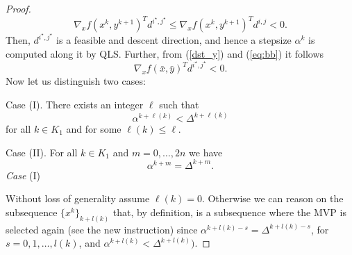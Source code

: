 \begin{proof}
\begin{equation}
 \nabla_xf(x^k,y^{k+1})^Td^{i^\star,j^\star}\le \nabla_xf(x^k,y^{k+1})^Td^{i,j}<0.
\end{equation}
Then, $d^{i^\star,j^\star}$ is a feasible and descent direction, and hence a stepsize $\alpha^k$ is computed along it by QLS.
Further, from (\ref{dst_y}) and (\ref{eq:bb}) it follows
\begin{equation}\label{desc_mvp}
 \nabla_xf(\bar x,\bar y)^Td^{i^\star,j^\star}<0.
\end{equation}
Now let us distinguish two cases:
\par\medskip\noindent
Case (I). There exists an integer $\ell$  such that
\begin{equation}\label{caseI}
 \alpha^{k+\ell(k)}<\Delta^{k+\ell(k)}
\end{equation}
for all $k\in K_1$ and for some $\ell(k)\le \ell$.
\par\medskip\noindent 
Case (II). For all $k\in K_1$ and $m=0,\ldots ,2n$ we have
\begin{equation}\label{caseII}
 \alpha^{k+m}=\Delta^{k+m}.
\end{equation}
{\it Case} (I)
\par\medskip\noindent
Without loss of generality assume $\ell (k)=0$.
Otherwise we can reason on the subsequence $\{x^k\}_{k+l(k)}$ that, by definition,
is a subsequence where the  MVP is selected again (see the new instruction) since $\alpha^{k+l(k)-s}=\Delta^{k+l(k)-s}$,
for $s=0,1,\ldots ,l(k)$,
and $\alpha^{k+l(k)}<\Delta^{k+l(k)})$.


\end{proof}
